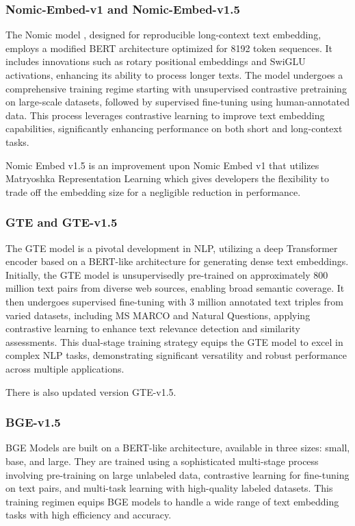 \subsubsection{Nomic-Embed-v1 and Nomic-Embed-v1.5} \label{model:nomic-embed}
The Nomic model \cite{nussbaum2024nomic}, designed for reproducible long-context text embedding, employs a modified BERT architecture optimized for 8192 token sequences.
It includes innovations such as rotary positional embeddings and SwiGLU activations, enhancing its ability to process longer texts.
The model undergoes a comprehensive training regime starting with unsupervised contrastive pretraining on large-scale datasets, followed by supervised fine-tuning using human-annotated data.
This process leverages contrastive learning to improve text embedding capabilities, significantly enhancing performance on both short and long-context tasks.

Nomic Embed v1.5 is an improvement upon Nomic Embed v1 that utilizes Matryoshka Representation Learning \cite{kusupati2024matryoshka} which gives developers the flexibility to trade off the embedding size for a negligible reduction in performance.

\subsubsection{GTE and GTE-v1.5} \label{model:gte}
The \ac{GTE} model is a pivotal development in \ac{NLP}, utilizing a deep Transformer encoder based on a \ac{BERT}-like architecture for generating dense text embeddings.
Initially, the \ac{GTE} model is unsupervisedly pre-trained on approximately 800 million text pairs from diverse web sources, enabling broad semantic coverage.
It then undergoes supervised fine-tuning with 3 million annotated text triples from varied datasets, including MS MARCO and Natural Questions, applying contrastive learning to enhance text relevance detection and similarity assessments.
This dual-stage training strategy equips the \ac{GTE} model to excel in complex \ac{NLP} tasks, demonstrating significant versatility and robust performance across multiple applications.

There is also updated version \ac{GTE}-v1.5.

\subsubsection{BGE-v1.5} \label{model:bge}
\ac{BGE} Models \cite{bge_embedding} are built on a BERT-like architecture, available in three sizes: small, base, and large.
They are trained using a sophisticated multi-stage process involving pre-training on large unlabeled data, contrastive learning for fine-tuning on text pairs, and multi-task learning with high-quality labeled datasets.
This training regimen equips BGE models to handle a wide range of text embedding tasks with high efficiency and accuracy.

